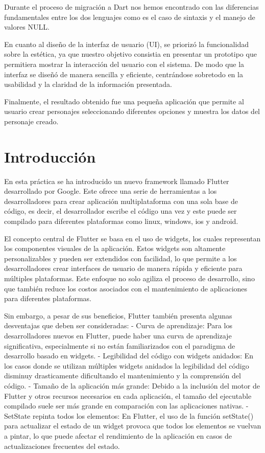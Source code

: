 \documentclass{article}
\begin{document}
Durante el proceso de migración a Dart nos hemos encontrado con las diferencias fundamentales entre los dos lenguajes como es el caso de sintaxis y el manejo de valores NULL.

En cuanto al diseño de la interfaz de usuario (UI), se priorizó la funcionalidad sobre la estética, ya que nuestro objetivo consistia en presentar un prototipo que permitiera mostrar 
la interacción del usuario con el sistema. De modo que la interfaz se diseñó de manera sencilla y eficiente, centrándose sobretodo en la usabilidad y la claridad de la información presentada.

Finalmente, el resultado obtenido fue una pequeña aplicación que permite al usuario crear personajes seleccionando diferentes opciones y muestra los datos del personaje creado.


\section{Introducción}

En esta práctica se ha introducido un nuevo framework llamado Flutter desarrollado por Google. Este ofrece una serie de herramientas a los desarrolladores para 
crear aplicación multiplataforma con una sola base de código, es decir, el desarrollador escribe el código una vez y este puede ser compilado para diferentes plataformas como linux, windows, ios y android.

El concepto central de Flutter se basa en el uso de widgets, los cuales representan los componentes visuales de la aplicación. 
Estos widgets son altamente personalizables y pueden ser extendidos con facilidad, lo que permite a los desarrolladores crear interfaces
de usuario de manera rápida y eficiente para múltiples plataformas. Este enfoque no solo agiliza el proceso de desarrollo, sino que también 
reduce los costos asociados con el mantenimiento de aplicaciones para diferentes plataformas.

Sin embargo, a pesar de sus beneficios, Flutter también presenta algunas desventajas que deben ser consideradas:
- Curva de aprendizaje: Para los desarrolladores nuevos en Flutter, puede haber una curva de aprendizaje significativa, especialmente si no están familiarizados con el paradigma de desarrollo basado en widgets.
- Legibilidad del código con widgets anidados: En los casos donde se utilizan múltiples widgets anidados la legibilidad del código disminuy drasticamente dificultando el mantenimiento y la comprensión del código.
- Tamaño de la aplicación más grande: Debido a la inclusión del motor de Flutter y otros recursos necesarios en cada aplicación, el tamaño del ejecutable compilado suele ser más grande en comparación con las aplicaciones nativas.
- SetState repinta todos los elementos: En Flutter, el uso de la función setState() para actualizar el estado de un widget provoca que todos los elementos se vuelvan a pintar, lo que puede afectar el rendimiento de la aplicación en casos de actualizaciones frecuentes del estado.
\end{document}
